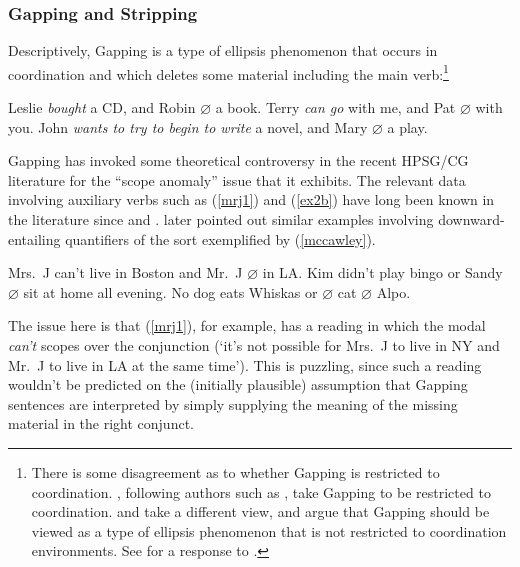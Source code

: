 \documentclass[output=paper,biblatex,babelshorthands,newtxmath,draftmode,colorlinks,citecolor=brown]{langscibook}
\begin{document}
\subsubsection{Gapping and Stripping}
\label{sec:gapping}

Descriptively, Gapping is a type of ellipsis phenomenon that occurs in
coordination and which deletes some material including the main
verb:\footnote{There is some disagreement as to whether Gapping is
restricted to coordination. \citet{kubota-levine-gapping}, following
authors such as \citet{johnson2009}, take Gapping to be restricted to
coordination. \citet{parkea18gapping} and \citet{parkDiss} take a
different view, and argue that Gapping should be viewed as a type of
ellipsis phenomenon that is not restricted to coordination
environments. See \citet[46--47]{KubotaLevineBook} for a response to
\citet{parkea18gapping}.}

\begin{exe}
 \ex\label{gapping}
  \begin{xlist}
 \ex\label{ex-leslie-bought-a-cd}
    Leslie \emph{bought} a CD, and Robin   \ensuremath{\varnothing}  a book.
 \ex
    Terry \emph{can go} with me, and Pat  \ensuremath{\varnothing}  with you.
 \ex
    John \emph{wants to try to begin to write} a novel, and Mary  \ensuremath{\varnothing}  a play.
  \end{xlist}
\end{exe}
Gapping has invoked some theoretical controversy in the recent
HPSG/CG literature for the ``scope anomaly'' issue that it exhibits.
The relevant data involving auxiliary verbs such as (\ref{mrj1}) and (\ref{ex2b})
have long been known in the literature since
\citet{oehrle71,oehrle1987} and 
\citet{siegel87}. \citet[247]{mccawley1993} later pointed out similar examples
involving downward-entailing quantifiers of the sort exemplified by (\ref{mccawley}).

\begin{exe}
 \ex\label{scope}
  \begin{xlist}
 \ex\label{mrj1}
    Mrs.\ J can't live in Boston and Mr.\ J  \ensuremath{\varnothing}  in LA.
 \ex\label{ex2b}
    Kim didn't play bingo or Sandy  \ensuremath{\varnothing}  sit at home all evening.
 \ex\label{mccawley}
    No dog eats Whiskas or  \ensuremath{\varnothing}  cat  \ensuremath{\varnothing}  Alpo.
  \end{xlist}
\end{exe}
The issue here is that (\ref{mrj1}), for example, has a reading in
which the modal \textit{can't} scopes over the conjunction (`it's not
possible for Mrs.~J to live in NY and Mr.~J to live in LA at the same
time'). This is puzzling, since such a reading wouldn't be predicted
on the (initially plausible) assumption that Gapping sentences are interpreted by simply supplying the meaning of the missing material
in the right conjunct.
\end{document}
